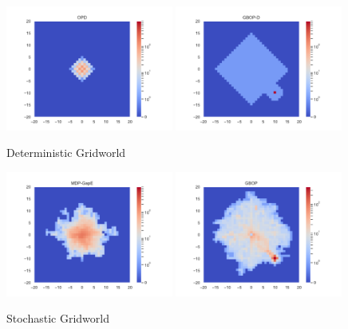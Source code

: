 \documentclass[runningheads]{llncs}
\begin{document}
\begin{figure}[H]
    \centering
    \includegraphics[width=0.49\textwidth]{img/occupations_OPD.pdf}
	\hfill
    \includegraphics[width=0.49\textwidth]{img/occupations_GBOP-D.pdf}
    \caption{Deterministic Gridworld}
    \label{fig:visits-d}
\end{figure}
\begin{figure}[H]
    \centering
    \includegraphics[width=0.49\textwidth]{img/occupations_MDP-GapE.pdf}
    \hfill
    \includegraphics[width=0.49\textwidth]{img/occupations_GBOP.pdf}
    \caption{Stochastic Gridworld}
    \label{fig:visits-s}
\end{figure}
\end{document}
